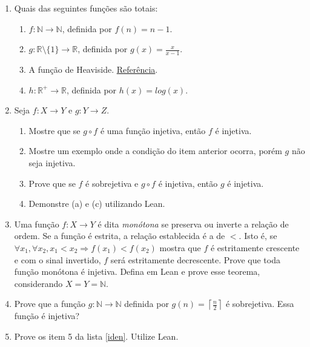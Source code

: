 \begin{enumerate}
    \item Quais das seguintes funções são totais: 
    \begin{enumerate}
        \item $f : \mathbb{N} \to \mathbb{N}$, definida por $f(n) = n - 1$.
        \item $g : \mathbb{R}\setminus\{1\} \to \mathbb{R}$, definida por $g(x)
        = \frac{x}{x - 1}$. 
        \item A função de Heaviside. \href{http://mathworld.wolfram.com/
        HeavisideStepFunction.html}{Referência}. 
        \item $h : \mathbb{R}^+ \to \mathbb{R}$, definida por $h(x) = log(x)$.
    \end{enumerate}
    \item Seja $f : X \to Y$ e $g : Y \to Z$. 
    \begin{enumerate}
        \item Mostre que se $g \circ f$ é uma função injetiva, então $f$ é
        injetiva. 
        \item Mostre um exemplo onde a condição do item anterior ocorra, porém
        $g$ não seja injetiva. 
        \item Prove que se $f$ é sobrejetiva e $g \circ f$ é injetiva, então
        $g$ é injetiva. 
        \item Demonstre (a) e (c) utilizando Lean. 
    \end{enumerate}
    \item Uma função $f : X \to Y$ é dita \textit{monótona} se preserva ou
    inverte a relação de ordem. Se a função é estrita, a relação establecida é
    a de $<$. Isto é, se $\forall x_1, \forall x_2, x_1 < x_2 \Rightarrow
    f(x_1) < f(x_2) $ mostra que $f$ é estritamente crescente e com o sinal
    invertido, $f$ será estritamente decrescente. Prove que toda função
    monótona é injetiva. Defina em Lean e prove esse teorema, considerando $X
    = Y = \mathbb{N} $. 
    \item Prove que a função $g : \mathbb{N} \to \mathbb{N}$ definida por
    $g(n) = \left \lceil{\frac{n}{2}}\right \rceil$ é sobrejetiva. Essa função
    é injetiva? 
    \item Prove os item 5 da lista \ref{iden}. Utilize Lean.
\end{enumerate}